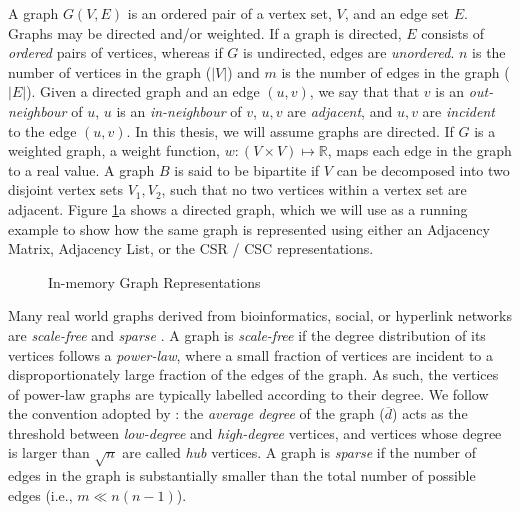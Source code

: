A graph $G(V, E)$ is an ordered pair of a vertex set, $V$, and an edge set $E$. Graphs may be directed and/or weighted. If a graph is directed, $E$ consists of \textit{ordered} pairs of vertices, whereas if $G$ is undirected, edges are \textit{unordered}.
$n$ is the number of vertices in the graph ($|V|$) and $m$ is the number of edges in the graph ($|E|$).
Given a directed graph and an edge $(u,v)$, we say that that $v$ is an \textit{out-neighbour} of $u$, $u$ is an \textit{in-neighbour} of $v$, $u, v$ are \textit{adjacent}, and $u, v$ are \textit{incident} to the edge $(u,v)$. In this thesis, we will assume graphs are directed.
If $G$ is a weighted graph, a weight function, $w: (V \times V) \mapsto \mathbb{R}$, maps each edge in the graph to a real value. A graph $B$ is said to be bipartite if $V$ can be decomposed into two disjoint vertex sets $V_1, V_2$, such that no two vertices within a vertex set are adjacent.
Figure \ref{fig:graph_example}a shows a directed graph, which we will use as a running example to show how the same graph is represented using either an Adjacency Matrix, Adjacency List, or the \ac{CSR} / \ac{CSC} representations.



\begin{figure}[!htb]
    \begin{adjustwidth}{-0.75in}{-0.75in}
        \centering
        
        \caption{
            In-memory Graph Representations
        }
        \label{fig:graph_example}   %
    \end{adjustwidth}
\end{figure}


Many real world graphs derived from bioinformatics, social, or hyperlink networks are
\textit{scale-free} \cite{barabasi2009scale, sapco} and \textit{sparse} \cite{danisch2018listing}.
A graph is \textit{scale-free} if the degree distribution of its vertices follows a \textit{power-law}, where a small fraction of vertices are incident to a disproportionately large fraction of the edges of the graph. As such, the vertices of power-law graphs are typically labelled according to their degree. We follow the convention adopted by \citet{esfahani2021locality}: the \textit{average degree} of the graph ($\overline{d}$) acts as the threshold between 
\textit{low-degree} and \textit{high-degree} vertices, and vertices whose degree is larger than $\sqrt{n}$ are called \textit{hub} vertices. 
A graph is \textit{sparse} if the number of edges in the graph is substantially smaller than the total number of possible edges (i.e., $m \ll n(n-1)$). 

